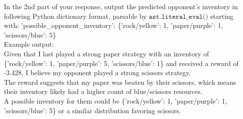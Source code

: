 \documentclass{article} %
\begin{document}
\begin{tcolorbox}[
    title={\small \textbf{ToM Module User Message 1}},
    width=\linewidth, %
    fontupper=\fontsize{9pt}{11pt}\selectfont\ttfamily %
]
In the 2nd part of your response, output the predicted opponent's inventory in following Python dictionary format, parsable by $\texttt{ast.literal\_eval()}$ starting with:
'possible\_opponent\_inventory': \{'rock/yellow': 1, 'paper/purple': 1, 'scissors/blue': 5\} \\
Example output:\\
Given that I last played a strong paper strategy with an inventory of \{'rock/yellow': 1, 'paper/purple': 5, 'scissors/blue': 1\} and received a reward of -3.428, I believe my opponent played a strong scissors strategy.\\
The reward suggests that my paper was beaten by their scissors, which means their inventory likely had a higher count of blue/scissors resources.\\
A possible inventory for them could be \{'rock/yellow': 1, 'paper/purple': 1, 'scissors/blue': 5\} or a similar distribution favoring scissors.

\end{tcolorbox}
\vspace{10mm}
\end{document}
